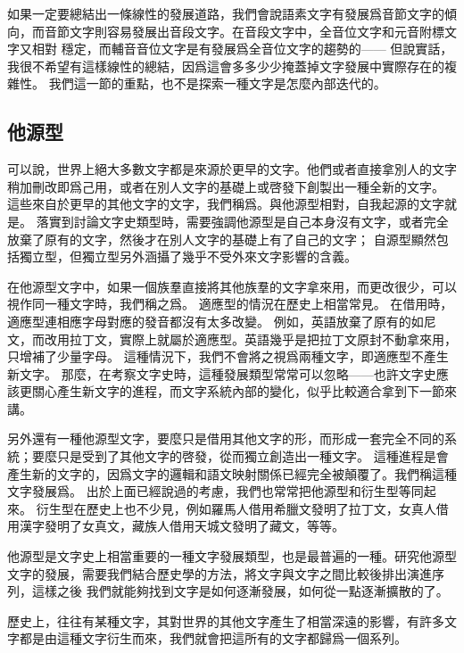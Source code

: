 如果一定要總結出一條線性的發展道路，我們會說語素文字有發展爲音節文字的傾向，而音節文字則容易發展出音段文字。在音段文字中，全音位文字和元音附標文字又相對
穩定，而輔音音位文字是有發展爲全音位文字的趨勢的——
但說實話，我很不希望有這樣線性的總結，因爲這會多多少少掩蓋掉文字發展中實際存在的複雜性。
我們這一節的重點，也不是探索一種文字是怎麼內部迭代的。

\subsection{他源型}
可以說，世界上絕大多數文字都是來源於更早的文字。他們或者直接拿別人的文字稍加刪改即爲己用，或者在別人文字的基礎上或啓發下創製出一種全新的文字。
這些來自於更早的其他文字的文字，我們稱爲。與他源型相對，自我起源的文字就是。
落實到討論文字史類型時，需要強調他源型是自己本身沒有文字，或者完全放棄了原有的文字，然後才在別人文字的基礎上有了自己的文字；
自源型顯然包括獨立型，但獨立型另外涵攝了幾乎不受外來文字影響的含義。

在他源型文字中，如果一個族羣直接將其他族羣的文字拿來用，而更改很少，可以視作同一種文字時，我們稱之爲。
適應型的情況在歷史上相當常見。
在借用時，適應型連相應字母對應的發音都沒有太多改變。
例如，英語放棄了原有的如尼文，而改用拉丁文，實際上就屬於適應型。英語幾乎是把拉丁文原封不動拿來用，只增補了少量字母。
這種情況下，我們不會將之視爲兩種文字，即適應型不產生新文字。
那麼，在考察文字史時，這種發展類型常常可以忽略——也許文字史應該更關心產生新文字的進程，而文字系統內部的變化，似乎比較適合拿到下一節來講。

另外還有一種他源型文字，要麼只是借用其他文字的形，而形成一套完全不同的系統；要麼只是受到了其他文字的啓發，從而獨立創造出一種文字。
這種進程是會產生新的文字的，因爲文字的邏輯和語文映射關係已經完全被顛覆了。我們稱這種文字發展爲。
出於上面已經說過的考慮，我們也常常把他源型和衍生型等同起來。
衍生型在歷史上也不少見，例如羅馬人借用希臘文發明了拉丁文，女真人借用漢字發明了女真文，藏族人借用天城文發明了藏文，等等。

他源型是文字史上相當重要的一種文字發展類型，也是最普遍的一種。研究他源型文字的發展，需要我們結合歷史學的方法，將文字與文字之間比較後排出演進序列，這樣之後
我們就能夠找到文字是如何逐漸發展，如何從一點逐漸擴散的了。

歷史上，往往有某種文字，其對世界的其他文字產生了相當深遠的影響，有許多文字都是由這種文字衍生而來，我們就會把這所有的文字都歸爲一個系列。

